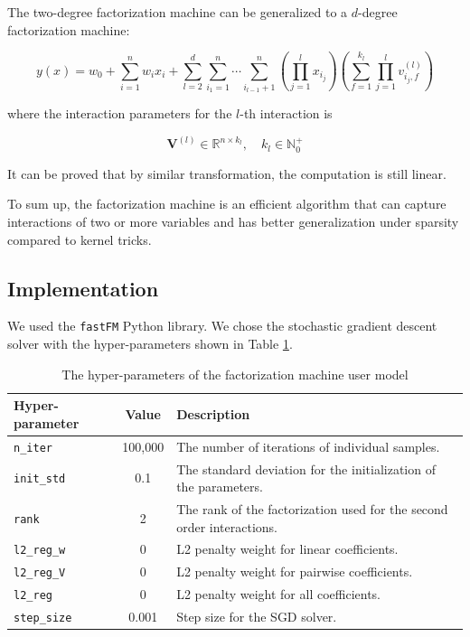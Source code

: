         The two-degree factorization machine can be generalized to a $d$-degree factorization machine:

        \[
        y(x) = w_0 + \sum_{i=1}^n w_ix_i +
        \sum_{l=2}^d\sum_{i_1=1}^n\cdots\sum_{i_{l-1}+1}^n \left( \prod_{j=1}^l x_{i_j} \right)
        \left( \sum_{f=1}^{k_l}\prod_{j=1}^l v_{i_j,f}^{(l)} \right)
        \]

        where the interaction parameters for the $l$-th interaction is

        \[
        \bm{V}^{(l)} \in \mathbb{R}^{n \times k_l}, \quad k_l \in \mathbb{N}_0^+
        \]

        It can be proved that by similar transformation, the computation is still linear. \cite{Rendle2010}

        To sum up, the factorization machine is an efficient algorithm
        that can capture interactions of two or more variables
        and has better generalization under sparsity compared to kernel tricks.

    \subsection{Implementation}

        We used the \verb|fastFM|\cite{bayer_fastfm:_2016} Python library.
        We chose the stochastic gradient descent solver with the hyper-parameters shown in Table \ref{table:fm param}.

        \begin{table}[hpbt]
        \centering
        \begin{tabular}{lcl}
            \hline
            Hyper-parameter & Value & Description \\
            \hline
            \verb|n_iter|    & 100,000 & The number of iterations of individual samples. \\
            \verb|init_std|  & 0.1 & The standard deviation for the initialization of the parameters. \\
            \verb|rank|      & 2 & The rank of the factorization used for the second order interactions. \\
            \verb|l2_reg_w|  & 0 & L2 penalty weight for linear coefficients. \\
            \verb|l2_reg_V|  & 0 & L2 penalty weight for pairwise coefficients. \\
            \verb|l2_reg|    & 0 & L2 penalty weight for all coefficients. \\
            \verb|step_size| & 0.001 & Step size for the SGD solver. \\
            \hline
        \end{tabular}
        \caption{The hyper-parameters of the factorization machine user model}
        \label{table:fm param}
        \end{table}

